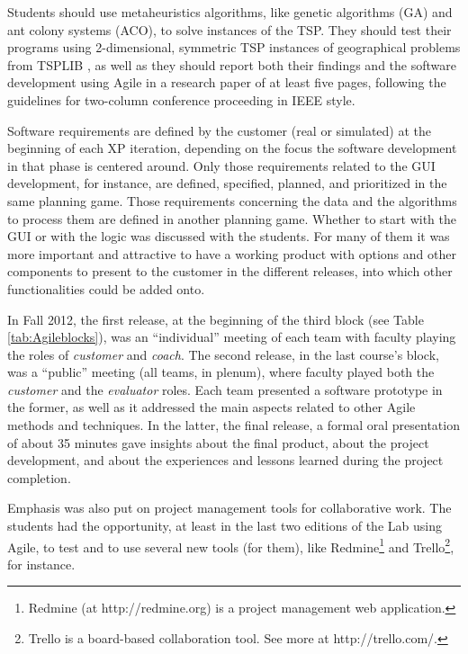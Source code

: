 \documentclass[conference]{IEEEtran}
\begin{document}
Students should use metaheuristics algorithms, like genetic algorithms (GA) and ant colony systems (ACO), to solve instances of the TSP. They should test their programs using 2-dimensional, symmetric TSP instances of geographical problems from TSPLIB \cite{Re91}, as well as they should report both their findings and the software development using Agile in a research paper of at least five pages, following the guidelines for two-column conference proceeding in IEEE style. 

Software requirements are defined by the customer (real or simulated) at the beginning of each XP iteration, depending on the focus the software development in that phase is centered around. Only those requirements related to the GUI development, for instance, are defined, specified, planned, and prioritized in the same planning game. Those requirements concerning the data and the algorithms to process them are defined in another planning game. Whether to start with the GUI or with the logic was discussed with the students. For many of them it was more important and attractive to have a working product with options and other components to present to the customer in the different releases, into which other functionalities could be added onto.

In Fall 2012, the first release, at the beginning of the third block (see Table \ref{tab:Agileblocks}), was an ``individual'' meeting of each team with faculty playing the roles of \textit{customer} and \textit{coach}. The second release, in the last course's block, was a ``public'' meeting (all teams, in plenum), where faculty played both the \textit{customer} and the \textit{evaluator} roles. Each team presented a software prototype in the former, as well as it addressed the main aspects related to other Agile methods and techniques. In the latter, the final release, a formal oral presentation of about 35 minutes gave insights about the final product, about the project development, and about the experiences and lessons learned during the project completion.

Emphasis was also put on project management tools for collaborative work. The students had the opportunity, at least in the last two editions of the Lab using Agile, to test and to use several new tools (for them), like Redmine\footnote{Redmine (at http://redmine.org) is a project management web application.} and Trello\footnote{Trello is a board-based collaboration tool. See more at http://trello.com/.}, for instance. 


\end{document}
